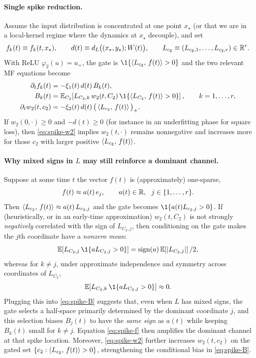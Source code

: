 \paragraph{Single spike reduction.}
Assume the input distribution is concentrated at one point $x_\star$ (or that we are in a local-kernel regime where the dynamics at $x_\star$ decouple), and set
\[
f_k(t)\equiv f_k(t,x_\star),\qquad d(t)\equiv d_L\big((x_\star,y_\star);W(t)\big),\qquad
L_{c_2}\equiv (L_{c_2,1},\dots,L_{c_2,r})\in\mathbb{R}^r.
\]
With ReLU $\varphi_2(u)=u_+$, the gate is $\1\{\ip{L_{c_2}}{f(t)}>0\}$ and the two relevant MF equations become
\begin{align}
\partial_t f_k(t)
&=-\xi_1(t)\,d(t)\,B_k(t),\label{eq:spike-f}\\
B_k(t)
&=\E_{C_2}\!\left[L_{C_2,k}\,w_2(t,C_2)\,\1\!\left\{\ip{L_{C_2}}{f(t)}>0\right\}\right],\qquad k=1,\dots,r,\label{eq:spike-B}\\
\partial_t w_2(t,c_2)
&=-\xi_2(t)\,d(t)\,\big(\ip{L_{c_2}}{f(t)}\big)_+.\label{eq:spike-w2}
\end{align}
If $w_2(0,\cdot)\ge 0$ and $-d(t)\ge 0$ (for instance in an underfitting phase for square loss), then \eqref{eq:spike-w2} implies $w_2(t,\cdot)$ remains nonnegative and increases more for those $c_2$ with larger positive $\left\langle L_{c_2},\,f(t) \right\rangle$.

\paragraph{Why mixed signs in $L$ may still reinforce a dominant channel.}
Suppose at some time $t$ the vector $f(t)$ is (approximately) one-sparse,
\[
f(t)\approx a(t)\,e_{j},\qquad a(t)\in\mathbb{R},\ \ j\in\{1,\dots,r\}.
\]
Then $\left\langle L_{c_2},\,f(t) \right\rangle\approx a(t)\,L_{c_2,j}$ and the gate becomes $\1\{a(t)L_{c_2,j}>0\}$.
If (heuristically, or in an early-time approximation) $w_2(t,C_2)$ is not strongly \emph{negatively} correlated with the sign of $L_{C_2,j}$, then conditioning on the gate makes the $j$th coordinate have a \emph{nonzero mean}:
\[
\E\!\left[L_{C_2,j}\,\1\{aL_{C_2,j}>0\}\right]
=\mathrm{sign}(a)\,\E\!\left[|L_{C_2,j}|\right]/2,
\]
whereas for $k\neq j$, under approximate independence and symmetry across coordinates of $L_{C_2}$,
\[
\E\!\left[L_{C_2,k}\,\1\{aL_{C_2,j}>0\}\right]\approx 0.
\]
Plugging this into \eqref{eq:spike-B} suggests that, even when $L$ has mixed signs, the gate selects a half-space primarily determined by the dominant coordinate $j$, and this selection biases $B_j(t)$ to have the \emph{same sign} as $a(t)$ while keeping $B_k(t)$ small for $k\neq j$.
Equation \eqref{eq:spike-f} then amplifies the dominant channel at that spike location.
Moreover, \eqref{eq:spike-w2} further increases $w_2(t,c_2)$ on the gated set $\{c_2:\left\langle L_{c_2},\,f(t) \right\rangle>0\}$, strengthening the conditional bias in \eqref{eq:spike-B}.

